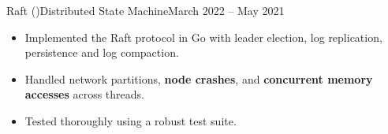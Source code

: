 \begin{cvsubsection}{Raft \normalfont(\href{ https://github.com/a3y3/Raft}{})}{Distributed State Machine}{March 2022 -- May 2021}
	\begin{itemize}
        \item Implemented the Raft protocol in Go with leader election, log replication, persistence and log compaction.
        \item Handled network partitions, \textbf{node crashes}, and \textbf{concurrent memory accesses} across threads.
        \item Tested thoroughly using a robust test suite.
	\end{itemize}
\end{cvsubsection}